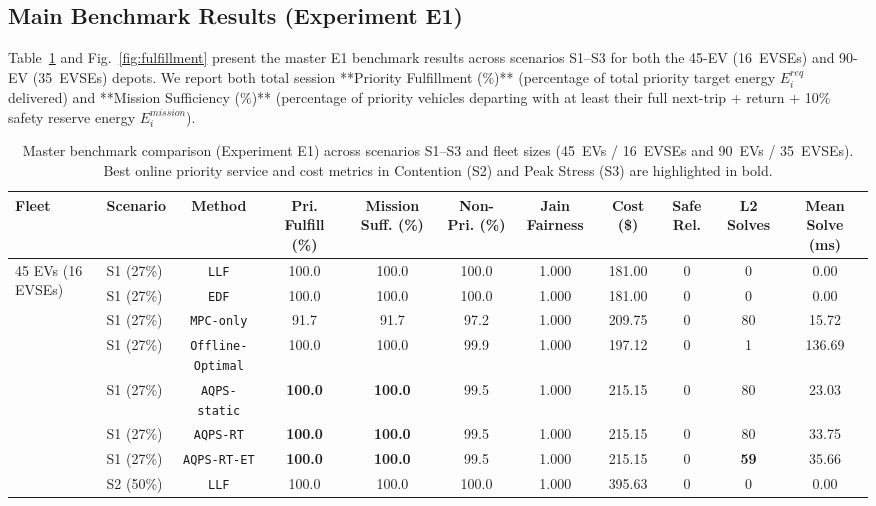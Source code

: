 \documentclass[final,3p,times,twocolumn]{elsarticle}
\begin{document}
\subsection{Main Benchmark Results (Experiment E1)}
\label{sec:main_results}

Table~\ref{tab:master_results} and Fig.~\ref{fig:fulfillment} present the master E1 benchmark results across scenarios S1--S3 for both the 45-EV (16~EVSEs) and 90-EV (35~EVSEs) depots. We report both total session **Priority Fulfillment (\%)** (percentage of total priority target energy $E_i^{req}$ delivered) and **Mission Sufficiency (\%)** (percentage of priority vehicles departing with at least their full next-trip + return + 10\% safety reserve energy $E_i^{mission}$).

\begin{table}[htbp]
\centering
\caption{Master benchmark comparison (Experiment E1) across scenarios S1--S3 and fleet sizes (45~EVs / 16~EVSEs and 90~EVs / 35~EVSEs). Best online priority service and cost metrics in Contention (S2) and Peak Stress (S3) are highlighted in bold.}
\label{tab:master_results}
\footnotesize
\begin{tabular}{llccccccccc}
\toprule
Fleet & Scenario & Method & Pri. Fulfill (\%) & Mission Suff. (\%) & Non-Pri. (\%) & Jain Fairness & Cost (\$) & Safe Rel. & L2 Solves & Mean Solve (ms) \\
\midrule
\multirow{21}{*}{45 EVs (16 EVSEs)} 
 & S1 (27\%) & \texttt{LLF}             & 100.0 & 100.0 & 100.0 & 1.000 & 181.00 & 0  & 0  & 0.00  \\
 & S1 (27\%) & \texttt{EDF}             & 100.0 & 100.0 & 100.0 & 1.000 & 181.00 & 0  & 0  & 0.00  \\
 & S1 (27\%) & \texttt{MPC-only}        & 91.7  & 91.7  & 97.2  & 1.000 & 209.75 & 0  & 80 & 15.72 \\
 & S1 (27\%) & \texttt{Offline-Optimal} & 100.0 & 100.0 & 99.9  & 1.000 & 197.12 & 0  & 1  & 136.69 \\
 & S1 (27\%) & \texttt{AQPS-static}     & \textbf{100.0} & \textbf{100.0} & 99.5  & 1.000 & 215.15 & 0  & 80 & 23.03 \\
 & S1 (27\%) & \texttt{AQPS-RT}         & \textbf{100.0} & \textbf{100.0} & 99.5  & 1.000 & 215.15 & 0  & 80 & 33.75 \\
 & S1 (27\%) & \texttt{AQPS-RT-ET}      & \textbf{100.0} & \textbf{100.0} & 99.5  & 1.000 & 215.15 & 0  & \textbf{59} & 35.66 \\
\cmidrule{2-11}
 & S2 (50\%) & \texttt{LLF}             & 100.0 & 100.0 & 100.0 & 1.000 & 395.63 & 0  & 0  & 0.00  \\

\end{tabular}
\end{table}
\end{document}
